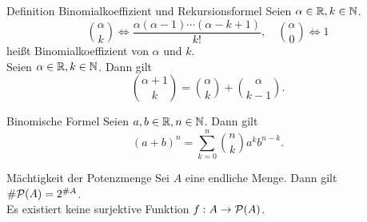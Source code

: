 \documentclass[main.tex]{subfiles}
\begin{document}
\begin{karte}{Definition Binomialkoeffizient und Rekursionsformel}
    Seien \(\alpha \in \mathbb{R}, k \in \mathbb{N} \).
    \[ \binom{\alpha}{k} \Leftrightarrow 
    \frac{ \alpha(\alpha-1)\cdots(\alpha-k+1) }{k!},
    \quad \binom{\alpha}{0} \Leftrightarrow 1 \]
    heißt Binomialkoeffizient von \(\alpha \) und \(k \). \\
    Seien \(\alpha \in \mathbb{R}, k \in \mathbb{N} \). Dann gilt
    \[ \binom{\alpha + 1}{k} = \binom{\alpha}{k} 
    + \binom{\alpha}{k-1}. \]
\end{karte}
\begin{karte}{Binomische Formel}
    Seien \(a, b \in \mathbb{R}, n \in \mathbb{N} \). Dann gilt
	\[ {(a+b)}^n = \sum_{k=0}^{n} \binom{n}{k} a^k b^{n-k}. \]
\end{karte}
\begin{karte}{Mächtigkeit der Potenzmenge}
    Sei \(A \) eine endliche Menge. Dann gilt 
    \( \# \mathcal{P}(A) = 2^{\#A} \).\\
    Es existiert keine surjektive Funktion 
    \(f : A \rightarrow \mathcal{P}(A) \).
\end{karte}
\end{document}
